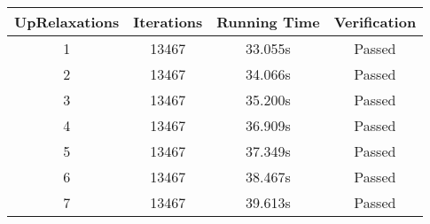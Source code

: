 \begin{tabular}{c|ccc}
\toprule
 UpRelaxations & Iterations & Running Time & Verification \\
\midrule
             1 &      13467 &      33.055s &       Passed \\
             2 &      13467 &      34.066s &       Passed \\
             3 &      13467 &      35.200s &       Passed \\
             4 &      13467 &      36.909s &       Passed \\
             5 &      13467 &      37.349s &       Passed \\
             6 &      13467 &      38.467s &       Passed \\
             7 &      13467 &      39.613s &       Passed \\
\bottomrule
\end{tabular}
